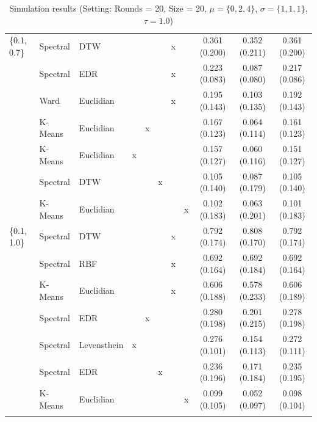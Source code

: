 \documentclass[12pt,a4paper,bibliography=totocnumbered,listof=totocnumbered]{scrartcl}
\begin{document}
\begin{appendix}
\begin{table}[!htbp]
\begin{tabularx}{\textwidth}{ lllcccccccc}
\{0.1, 0.7\} & Spectral  & DTW &  &  &  & x &  & 0.361 (0.200) & 0.352 (0.211) & 0.361 (0.200) \\ 
& Spectral  & EDR &  &  &  & x &  & 0.223 (0.083) & 0.087 (0.080) & 0.217 (0.086) \\ 
& Ward & Euclidian  &  &  &  & x &  & 0.195 (0.143) & 0.103 (0.135) & 0.192 (0.143) \\ 
& K-Means & Euclidian  &  & x &  &  &  & 0.167 (0.123) & 0.064 (0.114) & 0.161 (0.123) \\ 
& K-Means & Euclidian  & x &  &  &  &  & 0.157 (0.127) & 0.060 (0.116) & 0.151 (0.127) \\ 
& Spectral  & DTW &  &  & x &  &  & 0.105 (0.140) & 0.087 (0.179) & 0.105 (0.140) \\ 
& K-Means & Euclidian  &  &  &  &  & x & 0.102 (0.183) & 0.063 (0.201) & 0.101 (0.183) \\ 
\{0.1, 1.0\} & Spectral  & DTW &  &  &  & x &  & 0.792 (0.174) & 0.808 (0.170) & 0.792 (0.174) \\ 
& Spectral  & RBF &  &  &  & x &  & 0.692 (0.164) & 0.692 (0.184) & 0.692 (0.164) \\ 
& K-Means & Euclidian  &  &  &  & x &  & 0.606 (0.188) & 0.578 (0.233) & 0.606 (0.189) \\ 
& Spectral  & EDR &  & x &  &  &  & 0.280 (0.198) & 0.201 (0.215) & 0.278 (0.198) \\ 
& Spectral  & Levensthein & x &  &  &  &  & 0.276 (0.101) & 0.154 (0.113) & 0.272 (0.111) \\ 
& Spectral  & EDR &  &  & x &  &  & 0.236 (0.196) & 0.171 (0.184) & 0.235 (0.195) \\ 
& K-Means & Euclidian  &  &  &  &  & x & 0.099 (0.105) & 0.052 (0.097) & 0.098 (0.104) \\ 
\hline \\[-1.8ex] 
	\end{tabularx} 
	\caption{Simulation results (Setting: Rounds = 20, Size = 20, $\mu = \{0,2,4\}$, $\sigma =  \{1,1,1\}$, $\tau = 1.0$)} 
\end{table} 

\end{appendix}

\pagebreak
\end{document}
